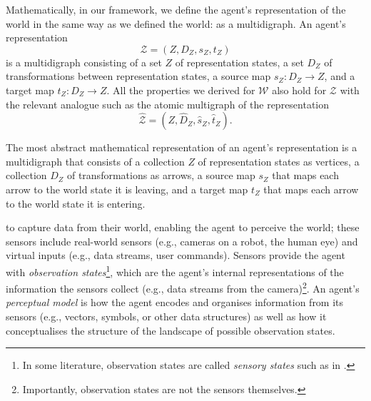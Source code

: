 Mathematically, in our framework, we define the agent's representation of the world in the same way as we defined the world: as a multidigraph.
An agent's representation
\begin{equation}
    \mathscr{Z} = (Z, D_{Z}, s_{Z}, t_{Z})
\end{equation}
is a multidigraph consisting of a set $Z$ of representation states, a set $D_{Z}$ of transformations between representation states, a source map $s_{Z}: D_{Z} \to Z$, and a target map $t_{Z}: D_{Z} \to Z$.
All the properties we derived for $\mathscr{W}$ also hold for $\mathscr{Z}$ with the relevant analogue such as the atomic multigraph of the representation
\begin{equation}
    \hat{\mathscr{Z}} = (Z, \hat{D}_{Z}, \hat{s}_{Z}, \hat{t}_{Z}).
\end{equation}

\begin{postulate}
    The most abstract mathematical representation of an agent's representation is a multidigraph that consists of a collection $Z$ of representation states as vertices, a collection $D_{Z}$ of transformations as arrows, a source map $s_{Z}$ that maps each arrow to the world state it is leaving, and a target map $t_{Z}$ that maps each arrow to the world state it is entering.
\end{postulate}

 to capture data from their world, enabling the agent to perceive the world; these sensors include real-world sensors (e.g., cameras on a robot, the human eye) and virtual inputs (e.g., data streams, user commands).
Sensors provide the agent with \emph{observation states}\footnote{In some literature, observation states are called \emph{sensory states} such as in \autocite{Ramstead2020}.}, which are the agent's internal representations of the information the sensors collect (e.g., data streams from the camera)\footnote{
	Importantly, observation states are not the sensors themselves.
}.
An agent's \emph{perceptual model} is how the agent encodes and organises information from its sensors (e.g., vectors, symbols, or other data structures) as well as how it conceptualises the structure of the landscape of possible observation states.

